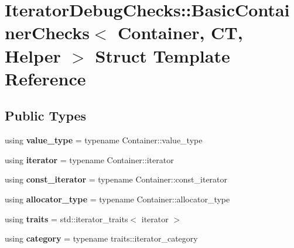 \hypertarget{struct_iterator_debug_checks_1_1_basic_container_checks}{}\section{Iterator\+Debug\+Checks\+:\+:Basic\+Container\+Checks$<$ Container, CT, Helper $>$ Struct Template Reference}
\label{struct_iterator_debug_checks_1_1_basic_container_checks}
\subsection*{Public Types}
\begin{DoxyCompactItemize}
\item 
\mbox{\label{struct_iterator_debug_checks_1_1_basic_container_checks_ae2a7debeb05f1de70ffff914e20953a4}} 
using {\bfseries value\+\_\+type} = typename Container\+::value\+\_\+type
\item 
\mbox{\label{struct_iterator_debug_checks_1_1_basic_container_checks_a4ae9abaa353583e86368e968af8eaf4a}} 
using {\bfseries iterator} = typename Container\+::iterator
\item 
\mbox{\label{struct_iterator_debug_checks_1_1_basic_container_checks_ab351f0fbbc0c0d0c1374a957517f9cfb}} 
using {\bfseries const\+\_\+iterator} = typename Container\+::const\+\_\+iterator
\item 
\mbox{\label{struct_iterator_debug_checks_1_1_basic_container_checks_a63fd5fac1c64b3da3e774b884e05ff67}} 
using {\bfseries allocator\+\_\+type} = typename Container\+::allocator\+\_\+type
\item 
\mbox{\label{struct_iterator_debug_checks_1_1_basic_container_checks_a9f8047bacad5d6f1e8987105243f46f0}} 
using {\bfseries traits} = std\+::iterator\+\_\+traits$<$ iterator $>$
\item 
\mbox{\label{struct_iterator_debug_checks_1_1_basic_container_checks_aefc75427b850ffd9dd6e40ca8b5474e7}} 
using {\bfseries category} = typename traits\+::iterator\+\_\+category
\end{DoxyCompactItemize}

